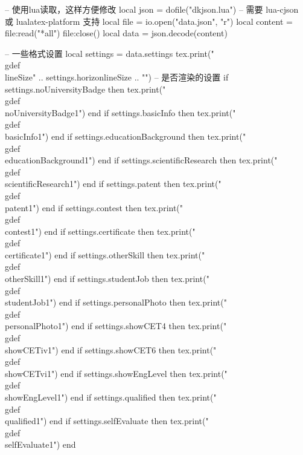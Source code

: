\documentclass[10pt, a4paper, oneside]{ctexart}
\begin{document}
\setlength{\parindent}{0pt}

\begin{luacode}
-- 使用lua读取，这样方便修改
local json = dofile("dkjson.lua")  -- 需要 lua-cjson 或 lualatex-platform 支持
local file = io.open("data.json", "r")
local content = file:read("*all")
file:close()
local data = json.decode(content)

-- 一些格式设置
local settings = data.settings
tex.print("\\gdef\\lineSize{" .. settings.horizonlineSize .. "}")
-- 是否渲染的设置
if settings.noUniversityBadge then
    tex.print("\\gdef\\noUniversityBadge{1}")
end
if settings.basicInfo then
    tex.print("\\gdef\\basicInfo{1}")
end
if settings.educationBackground then
    tex.print("\\gdef\\educationBackground{1}")
end
if settings.scientificResearch then
    tex.print("\\gdef\\scientificResearch{1}")
end
if settings.patent then
    tex.print("\\gdef\\patent{1}")
end
if settings.contest then
    tex.print("\\gdef\\contest{1}")
end
if settings.certificate then
    tex.print("\\gdef\\certificate{1}")
end
if settings.otherSkill then
    tex.print("\\gdef\\otherSkill{1}")
end
if settings.studentJob then
    tex.print("\\gdef\\studentJob{1}")
end
if settings.personalPhoto then
    tex.print("\\gdef\\personalPhoto{1}")
end
if settings.showCET4 then
    tex.print("\\gdef\\showCETiv{1}")
end
if settings.showCET6 then
    tex.print("\\gdef\\showCETvi{1}")
end
if settings.showEngLevel then
    tex.print("\\gdef\\showEngLevel{1}")
end
if settings.qualified then
    tex.print("\\gdef\\qualified{1}")
end
if settings.selfEvaluate then
    tex.print("\\gdef\\selfEvaluate{1}")
end


\end{luacode}
\end{document}
